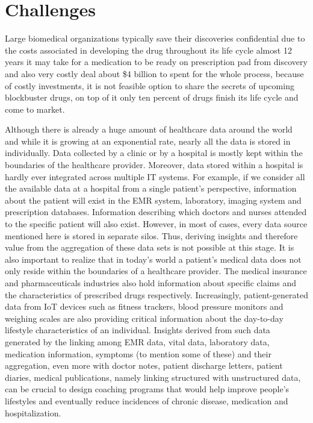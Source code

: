 \documentclass[sigconf]{acmart}
\begin{document}
\section{Challenges}
Large biomedical organizations typically save their discoveries confidential 
due to the costs associated in developing the drug throughout its life cycle 
almost 12 years it may take for a medication to be ready on prescription
pad from discovery and also very costly deal about \$4 billion to spent for
the whole process, because of costly investments, it is not feasible option 
to share the secrets of upcoming blockbuster drugs, on top of it only ten
percent of drugs finish its life cycle and come to market\cite{TR06}.

Although there is already a 
huge amount of healthcare data around the world and while it is 
growing at an exponential rate, nearly all the data is stored in
individually. Data collected by a clinic or by a hospital is mostly 
kept within the boundaries of the healthcare provider. Moreover, 
data stored within a hospital is hardly ever integrated across 
multiple IT systems. For example, if we consider all the available 
data at a hospital from a single patient's perspective, information 
about the patient will exist in the EMR system, laboratory, imaging 
system and prescription databases. Information describing which 
doctors and nurses attended to the specific patient will also exist.
However, in most of cases, every data source mentioned here is stored
in separate silos. Thus, deriving insights and therefore value from 
the aggregation of these data sets is not possible at this stage. It
is also important to realize that in today's world a patient's 
medical data does not only reside within the boundaries of a 
healthcare provider. The medical insurance and pharmaceuticals 
industries also hold information about specific claims and the
characteristics of prescribed drugs respectively. Increasingly,
patient-generated data from IoT devices such as fitness trackers, 
blood pressure monitors and weighing scales are also providing 
critical information about the day-to-day lifestyle
characteristics of an individual. Insights derived from such data
generated by the linking among EMR data, vital data, laboratory
data, medication information, symptoms (to mention some of these)
and their aggregation, even more with doctor notes, patient
discharge letters, patient diaries, medical publications, namely
linking structured with unstructured data, can be crucial to
design coaching programs that would help improve people's
lifestyles and eventually reduce incidences of chronic disease,
medication and hospitalization\cite{TR04}.
\end{document}

